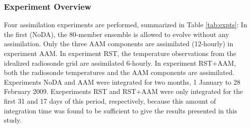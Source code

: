 \subsubsection{Experiment Overview}
Four assimilation experiments are performed, summarized in Table \ref{tab:expts}: In the first (NoDA), the 80-member ensemble is allowed to evolve without any assimilation. 
Only the three  AAM components are assimilated (12-hourly) in experiment AAM.  
In experiment RST, the temperature observations from the idealized radiosonde grid are assimilated 6-hourly.
In experiment RST+AAM, both the radiosonde temperatures and the AAM components are assimilated. 
Experiments NoDA and AAM were integrated for two months, 1 January to 28 February 2009.  
Exeperiments RST and RST+AAM were only integrated for the first 31 and 17 days of this period, respectively, because this amount of integration time was found to be sufficient to give the results presented in this study.
